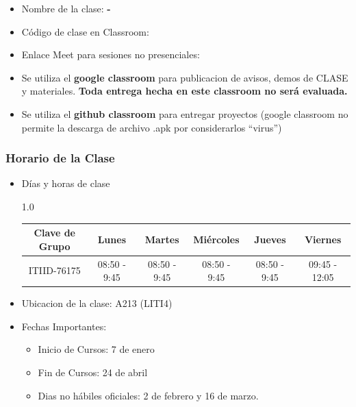 


\begin{frame}
\begin{itemize}
\frametitle{Plataforma Virtual para el Curso}
\item Nombre de la clase: \textbf{\nombreMateria-\cuatrimestre}
\item Código de clase en Classroom: \textbf{\claveClassroom}
\item Enlace Meet para sesiones no presenciales: \textbf{\claveMeet}
\item Se utiliza el \textbf{google classroom} para publicacion de avisos, demos de CLASE y materiales. \textbf{Toda entrega hecha en este classroom no será evaluada.}
\item Se utiliza el \textbf{github classroom} para entregar proyectos (google classroom no permite la descarga de archivo .apk por considerarlos ``virus'')
\end{itemize}
\end{frame}



\begin{frame}
\frametitle{Horario de la Clase}


\begin{itemize}
\item Días y horas de clase
\tiny
\begin{spacing}{1.0}
\begin{center}
\begin{tabular}{c|ccccc}
\hline 
\textbf{Clave de Grupo}   & Lunes          & Martes        & Miércoles     & Jueves        & Viernes          \\ \hline 
ITIID-76175                & 08:50 - 9:45 & 08:50 - 9:45 & 08:50 - 9:45 & 08:50 - 9:45 & 09:45 - 12:05    \\ \hline
\hline
\end{tabular}
\end{center}
\end{spacing}
\normalsize
\item Ubicacion de la clase: A213 (LITI4)
\item Fechas Importantes:
\begin{itemize}
\item Inicio de Cursos: 7 de enero
\item Fin de Cursos: 24 de abril
\item Dias no hábiles oficiales: 2 de febrero y 16 de marzo.
\end{itemize}
\end{itemize}

\end{frame}


